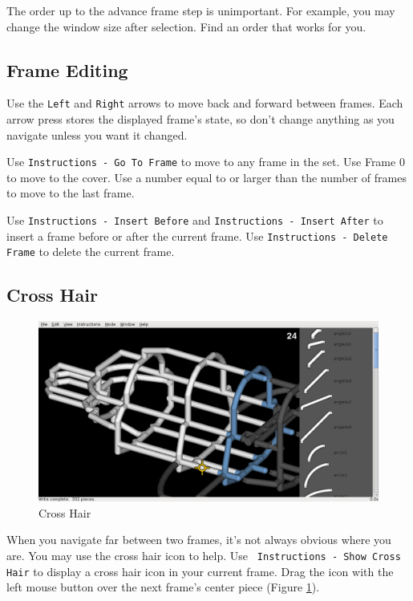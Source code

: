 \documentclass[12pt]{report}
\begin{document}
The order up to the advance frame step is unimportant.  For example,
you may change the window size after selection.  Find an order that
works for you.

\subsection{Frame Editing}

Use the {\tt Left} and {\tt Right} arrows to move back and forward
between frames.  Each arrow press stores the displayed frame's state,
so don't change anything as you navigate unless you want it changed.

Use {\tt Instructions - Go To Frame} to move to any frame in the set.
Use Frame 0 to move to the cover.  Use a number equal to or larger
than the number of frames to move to the last frame.

Use {\tt Instructions - Insert Before} and {\tt Instructions - Insert
  After} to insert a frame before or after the current frame.  Use
{\tt Instructions - Delete Frame} to delete the current frame.

\subsection{Cross Hair}

\begin{figure}[H]
\begin{center}
\includegraphics[width=5.38in]{doc_images/manual_instructions_xhair.png}
\caption{Cross Hair}
\label{InstructionsXhair}
\end{center}
\end{figure}

When you navigate far between two frames, it's not always obvious
where you are.  You may use the cross hair icon to help.  Use {\tt
  Instructions - Show Cross Hair} to display a cross hair icon in your
current frame.  Drag the icon with the left mouse button over the next
frame's center piece (Figure \ref{InstructionsXhair}).
\end{document}
